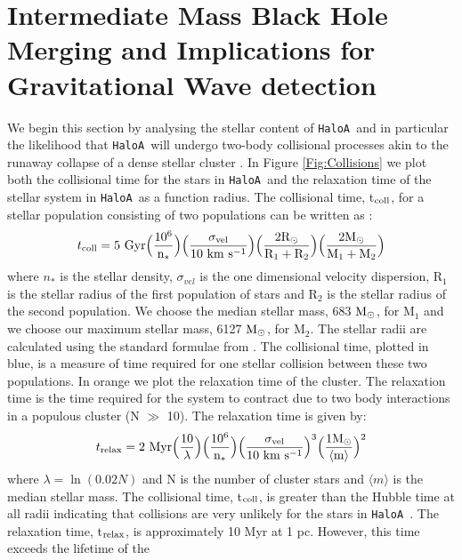 \documentclass[graphics, twocolumn, usenatbib]{mn2e}
\newcommand{\msolarc} {$\rm{M_{\odot}}$}
\newcommand{\ha} {\texttt{HaloA~}}
\begin{document}
\section{Intermediate Mass Black Hole Merging and Implications for Gravitational Wave detection} \label{Sec:GW}
We begin this section by analysing the stellar content of \ha and in particular the likelihood
that \ha will undergo two-body collisional processes akin to the runaway collapse of a dense stellar
cluster \citep{PortegiesZwart_2004, Gurkan_2004, Freitag_2006, Regan_2009b, Katz_2015}. In Figure
\ref{Fig:Collisions} we plot both the collisional time for the stars in \ha and the relaxation
time of the stellar system in \ha as a
function radius. The collisional time, t$_{\rm{coll}}$, for a stellar population consisting of two
populations can be written as \citep{Freitag_2008}:
\begin{equation}
  t_{\rm{coll}} = 5 \ \rm{Gyr} \Big( {10^6 \over n_*} \Big ) \Big( {\sigma_{vel} \over 10 \ \rm{km \ s^{-1}}} \Big ) \Big ({2 R_{\odot} \over R_1 + R_2} \Big) \Big ({2 M_{\odot} \over M_1 + M_2} \Big)
\end{equation}
where $n_*$ is the stellar density, $\sigma_{vel}$ is the one dimensional velocity dispersion,
R$_1$ is the stellar radius of the first population of stars and R$_2$ is the stellar radius of the
second population. We choose the median stellar mass, 683 \msolarc, for M$_1$ and we choose our
maximum stellar mass, 6127 \msolarc, for M$_2$. The stellar radii are calculated using the standard
formulae from \cite{Stahler_1986}. The collisional time, plotted in blue, is a measure of time
required for one
stellar collision between these two populations. In orange we plot the relaxation time of the cluster.
The relaxation time is the time required for the system to contract due to two body interactions in a
populous cluster (N $\gg$ 10). The relaxation time is given by:
\begin{equation}
  t_{\rm{relax}} = 2 \ \rm{Myr} \Big ( {10 \over \lambda} \Big )  \Big( {10^6 \over n_*} \Big ) \Big( {\sigma_{vel} \over 10 \ \rm{km \ s^{-1}}} \Big )^3 \Big ( {1  M_{\odot} \over \langle m \rangle } \Big )^2
\end{equation}
where $\lambda = \ln (0.02 N)$ and  N is the number of cluster stars and $\langle m \rangle$
is the median stellar mass. The collisional time, t$_{\rm{coll}}$, is greater than the Hubble time
at all radii indicating that collisions are very unlikely for the stars in \ha. The relaxation time,
t$_{\rm{relax}}$, is approximately 10 Myr at 1 pc. However, this time exceeds the lifetime of the
\end{document}
